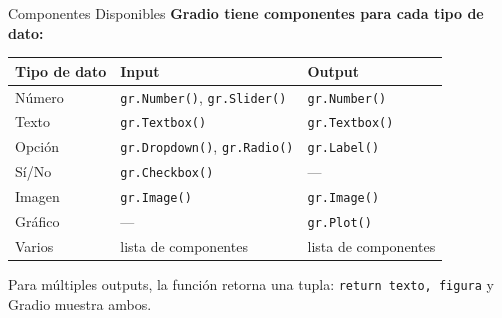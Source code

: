 \documentclass[aspectratio=169, 11pt]{beamer}
\begin{document}
\begin{frame}[shrink=5]{Componentes Disponibles}
  \vspace{-4pt}
  {\footnotesize\color{arcaDark}\bfseries
    Gradio tiene componentes para cada tipo de dato:}

  \vspace{6pt}
  {\scriptsize
  \begin{tabular}{@{}lll@{}}
    \toprule
    \textbf{Tipo de dato} & \textbf{Input} & \textbf{Output} \\
    \midrule
    N\'umero & \texttt{gr.Number()}, \texttt{gr.Slider()} & \texttt{gr.Number()} \\
    Texto & \texttt{gr.Textbox()} & \texttt{gr.Textbox()} \\
    Opci\'on & \texttt{gr.Dropdown()}, \texttt{gr.Radio()} & \texttt{gr.Label()} \\
    S\'i/No & \texttt{gr.Checkbox()} & --- \\
    Imagen & \texttt{gr.Image()} & \texttt{gr.Image()} \\
    Gr\'afico & --- & \texttt{gr.Plot()} \\
    Varios & lista de componentes & lista de componentes \\
    \bottomrule
  \end{tabular}
  }

  \vspace{6pt}
  {\scriptsize\color{textMuted}
    \faLightbulb\hspace{4pt} Para m\'ultiples outputs, la funci\'on retorna
    una tupla: \texttt{return texto, figura} y Gradio muestra ambos.}
\end{frame}
\end{document}
